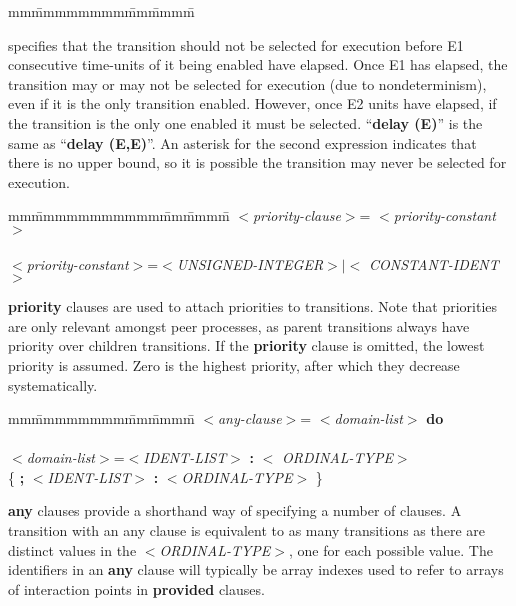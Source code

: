 \begin{tabbing}
mm\=mmmmmmmm\=mm\=mmmm\=\+\kill
{}\\
\end{tabbing}
 
specifies that the transition should not be selected for
execution before E1 consecutive time-units of it being
enabled have elapsed. Once E1 has elapsed, the transition
may or may not be selected for execution (due to
nondeterminism), even if it is the only transition enabled.
However, once E2 units have elapsed, if the transition is
the only one enabled it must be selected. ``{\bf delay (E)}'' is
the same as ``{\bf delay (E,E)}''. An asterisk for the second
expression indicates that there is no upper bound, so it is
possible the transition may never be selected for execution.

\begin{tabbing}
mm\=mmmmmmmmmmm\=mm\=mmmm\=\+\kill
$<${\em priority-clause}$>$\>= $<${\em priority-constant}$>$\\
\mbox{}\\
$<${\em priority-constant}$>$\>=\>$<${\em UNSIGNED-INTEGER}$>|<${\em
CONSTANT-IDENT}$>$\\
\end{tabbing}

{\bf priority} clauses are used to attach priorities to
transitions. Note that priorities are only relevant amongst
peer processes, as parent transitions always have priority
over children transitions. If the {\bf priority} clause is
omitted, the lowest priority is assumed. Zero is the
highest priority, after which they decrease systematically.

\begin{tabbing}
mm\=mmmmmmmm\=mm\=mmmm\=\+\kill
$<${\em any-clause}$>$\>= $<${\em domain-list}$>$ {\bf do}\\
\mbox{}\\
$<${\em domain-list}$>$\>=\>$<${\em IDENT-LIST}$>$ {\bf :} $<${\em
ORDINAL-TYPE}$>$\\
\>\>\>\{ {\bf ;} $<${\em IDENT-LIST}$>$ {\bf :} $<${\em ORDINAL-TYPE}$>$
\}\\
\end{tabbing}

{\bf any} clauses provide a shorthand way of specifying a
number of clauses. A transition with an any clause is
equivalent to as many transitions as there are distinct
values in the $<${\em ORDINAL-TYPE}$>$, one for each possible value.
The identifiers in an {\bf any} clause will typically be array
indexes used to refer to arrays of interaction points in
{\bf provided} clauses.
 
